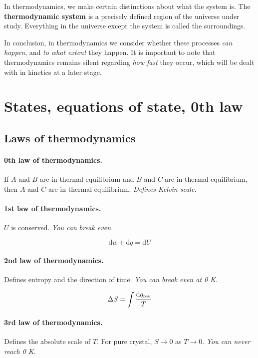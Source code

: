 \documentclass{article}
\numberwithin{theorem}{section}
\numberwithin{corollary}{section}
\numberwithin{postulate}{section}
\numberwithin{lemma}{section}
\numberwithin{definition}{section}
\begin{document}
In thermodynamics, we make certain distinctions about what the system is. The
\textbf{thermodynamic system} is a precisely defined region of the universe
under study. Everything in the universe except the system is called the
surroundings.

In conclusion, in thermodynamics we consider whether these processes \textit{can
happen}, and \textit{to what extent} they happen. It is important to note that
thermodynamics remains silent regarding \textit{how fast} they occur, which will
be dealt with in kinetics at a later stage.

\setcounter{section}{0}
\section{States, equations of state, 0th law}

\subsection{Laws of thermodynamics}

\paragraph{0th law of thermodynamics.} If $A$ and $B$ are in thermal equilibrium
and $B$ and $C$ are in thermal equilibrium, then $A$ and $C$ are in thermal 
equilibrium. \textit{Defines Kelvin scale.}

\paragraph{1st law of thermodynamics.} $U$ is conserved. \textit{You can break
even.}

\begin{equation}
  \mathrm{d}w + \mathrm{d}q = \mathrm{d}U
\end{equation}

\paragraph{2nd law of thermodynamics.} Defines entropy and the direction of
time. \textit{You can break even at 0 K}.

\begin{equation}
  \Delta S = \int \frac{\textnormal{d} q_{\mathrm{rev}}}{T}
\end{equation}

\paragraph{3rd law of thermodynamics.} Defines the absolute scale of $T$. For
pure crystal, $S \rightarrow 0$ as $T \rightarrow 0$. \textit{You can never
reach 0 K}.
\end{document}
